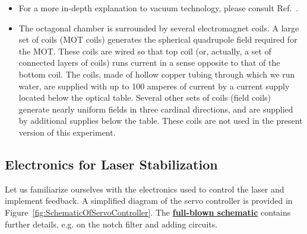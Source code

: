 \documentclass{../lab}
\begin{document}
\begin{itemize}
    \item For a more in-depth explanation to vacuum technology, please consult Ref.~\cite{Moore}.

    \item The octagonal chamber is surrounded by several electromagnet coils. A large set of coils (MOT coils) generates the spherical quadrupole field required for the MOT. These coils are wired so that top coil (or, actually, a set of connected layers of coils) runs current in a sense opposite to that of the bottom coil. The coils, made of hollow copper tubing through which we run water, are supplied with up to 100 amperes of current by a current supply located below the optical table. Several other sets of coils (field coils) generate nearly uniform fields in three cardinal directions, and are supplied by additional supplies below the table. These coils are not used in the present version of this experiment.
\end{itemize}

\subsection{Electronics for Laser Stabilization}

Let us familiarize ourselves with the electronics used to control the laser and implement feedback. A simplified diagram of the servo controller is provided in Figure~\ref{fig:SchematicOfServoController}. The \href{http://experimentationlab.berkeley.edu/sites/default/files/images/Full\_schematic.pdf}{\textbf{full-blown schematic}} contains further details, e.g. on the notch filter and adding circuits.
\end{document}
